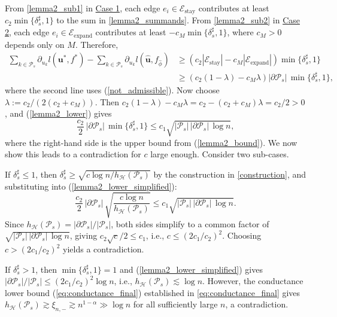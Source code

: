 \documentclass[
  12pt]{article}
\begin{document}
\noindent From \eqref{lemma2_sub1} in \underline{Case 1}, each edge $e_i \in \mathcal{E}_{\operatorname{stay}}$ contributes at least $c_2 \min\{\delta^\sharp_s, 1\}$ to the sum in \eqref{lemma2_summands}. From \eqref{lemma2_sub2} in \underline{Case 2}, each edge $e_i \in \mathcal{E}_{\operatorname{expand}}$ contributes at least $-c_M \min\{\delta^\sharp_s, 1\}$, where $c_M>0$ depends only on $M$. Therefore,
\begin{equation}
\label{lemma2_lower}
\begin{aligned}
\sum_{k \in \mathcal{P}_s} \partial_{u_k} l(\boldsymbol{u}^*,f^*)-\sum_{k \in \mathcal{P}_s} \partial_{u_k} l(\widehat{\boldsymbol{u}}, f_{\widehat{\phi}}) &\geq \left(c_2 |\mathcal{E}_{\operatorname{stay}}| - c_M |\mathcal{E}_{\operatorname{expand}}|\right) \min \{\delta^\sharp_s, 1\}\\
&\geq \left(c_2(1-\lambda) - c_M \lambda\right) |\partial \mathcal{P}_s|\, \min \{\delta^\sharp_s, 1\},
\end{aligned}
\end{equation}
where the second line uses (\ref{not_admissible}). Now choose $\lambda := c_2/(2(c_2+c_M))$. Then $c_2(1-\lambda)-c_M\lambda = c_2 - (c_2+c_M)\lambda = c_2/2 > 0$, and (\ref{lemma2_lower}) gives
\begin{equation}\label{lemma2_lower_simplified}
\frac{c_2}{2}\, |\partial \mathcal{P}_s|\, \min \{\delta^\sharp_s, 1\} \leq c_1 \sqrt{|\mathcal{P}_s|\,|\partial \mathcal{P}_s|\, \log n},
\end{equation}
where the right-hand side is the upper bound from (\ref{lemma2_bound}). We now show this leads to a contradiction for $c$ large enough. Consider two sub-cases.

If $\delta^\sharp_s \leq 1$, then $\delta^\sharp_s \geq \sqrt{c \log n / h_{\mathcal{H}}(\mathcal{P}_s)}$ by the construction in \eqref{construction}, and substituting into (\ref{lemma2_lower_simplified}):
$$\frac{c_2}{2}\, |\partial \mathcal{P}_s|\, \sqrt{\frac{c\log n}{h_{\mathcal{H}}(\mathcal{P}_s)}} \leq c_1 \sqrt{|\mathcal{P}_s|\,|\partial \mathcal{P}_s|\, \log n}.$$
Since $h_{\mathcal{H}}(\mathcal{P}_s) = |\partial \mathcal{P}_s|/|\mathcal{P}_s|$, both sides simplify to a common factor of $\sqrt{|\mathcal{P}_s|\,|\partial \mathcal{P}_s|\, \log n}$, giving $c_2\sqrt{c}/2 \leq c_1$, i.e., $c \leq (2c_1/c_2)^2$. Choosing $c > (2c_1/c_2)^2$ yields a contradiction.

If $\delta^\sharp_s > 1$, then $\min\{\delta^\sharp_s,1\}=1$ and (\ref{lemma2_lower_simplified}) gives $|\partial \mathcal{P}_s|/|\mathcal{P}_s| \leq (2c_1/c_2)^2 \log n$, i.e., $h_{\mathcal{H}}(\mathcal{P}_s) \lesssim \log n$. However, the conductance lower bound (\ref{eq:conductance_final}) established in \eqref{eq:conductance_final} gives $h_{\mathcal{H}}(\mathcal{P}_s) \gtrsim \xi_{n,-} \gtrsim n^{1-\alpha} \gg \log n$ for all sufficiently large $n$, a contradiction.
\end{document}
